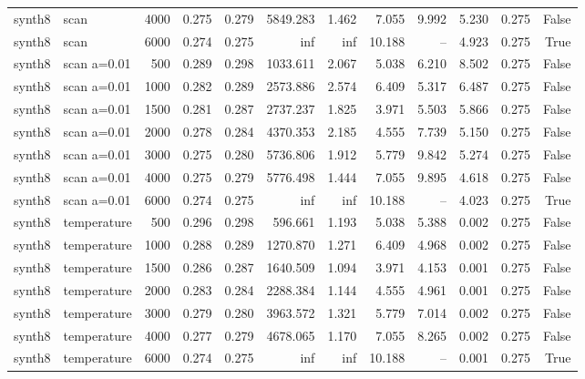 \begin{tabular}{llrrrrrrrrrr}
synth8 & scan & 4000 & 0.275 & 0.279 & 5849.283 & 1.462 & 7.055 & 9.992 & 5.230 & 0.275 & False \\
synth8 & scan & 6000 & 0.274 & 0.275 & inf & inf & 10.188 & -- & 4.923 & 0.275 & True \\
synth8 & scan a=0.01 & 500 & 0.289 & 0.298 & 1033.611 & 2.067 & 5.038 & 6.210 & 8.502 & 0.275 & False \\
synth8 & scan a=0.01 & 1000 & 0.282 & 0.289 & 2573.886 & 2.574 & 6.409 & 5.317 & 6.487 & 0.275 & False \\
synth8 & scan a=0.01 & 1500 & 0.281 & 0.287 & 2737.237 & 1.825 & 3.971 & 5.503 & 5.866 & 0.275 & False \\
synth8 & scan a=0.01 & 2000 & 0.278 & 0.284 & 4370.353 & 2.185 & 4.555 & 7.739 & 5.150 & 0.275 & False \\
synth8 & scan a=0.01 & 3000 & 0.275 & 0.280 & 5736.806 & 1.912 & 5.779 & 9.842 & 5.274 & 0.275 & False \\
synth8 & scan a=0.01 & 4000 & 0.275 & 0.279 & 5776.498 & 1.444 & 7.055 & 9.895 & 4.618 & 0.275 & False \\
synth8 & scan a=0.01 & 6000 & 0.274 & 0.275 & inf & inf & 10.188 & -- & 4.023 & 0.275 & True \\
synth8 & temperature & 500 & 0.296 & 0.298 & 596.661 & 1.193 & 5.038 & 5.388 & 0.002 & 0.275 & False \\
synth8 & temperature & 1000 & 0.288 & 0.289 & 1270.870 & 1.271 & 6.409 & 4.968 & 0.002 & 0.275 & False \\
synth8 & temperature & 1500 & 0.286 & 0.287 & 1640.509 & 1.094 & 3.971 & 4.153 & 0.001 & 0.275 & False \\
synth8 & temperature & 2000 & 0.283 & 0.284 & 2288.384 & 1.144 & 4.555 & 4.961 & 0.001 & 0.275 & False \\
synth8 & temperature & 3000 & 0.279 & 0.280 & 3963.572 & 1.321 & 5.779 & 7.014 & 0.002 & 0.275 & False \\
synth8 & temperature & 4000 & 0.277 & 0.279 & 4678.065 & 1.170 & 7.055 & 8.265 & 0.002 & 0.275 & False \\
synth8 & temperature & 6000 & 0.274 & 0.275 & inf & inf & 10.188 & -- & 0.001 & 0.275 & True \\
\bottomrule
\end{tabular}
